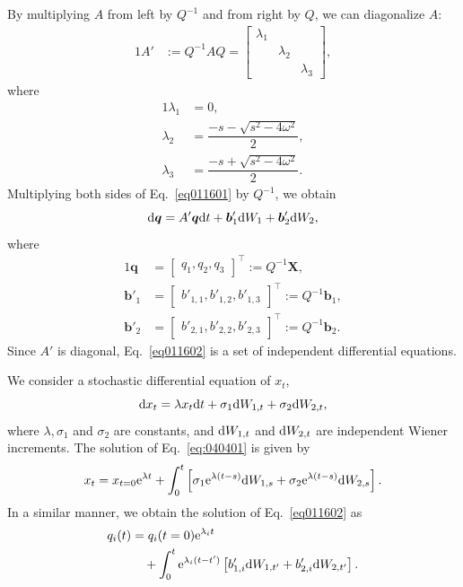 \documentclass[aps,pra,superscriptaddress,twocolumn
]{revtex4-2}
\newcommand{\e}{\mathrm{e}}
\renewcommand{\d}{{\rm d}}
\begin{document}
 By multiplying $A$ from left by $Q^{-1}$ and from right by $Q$, 
 we can diagonalize $A$:
 \begin{alignat}{1}
  A'&:= Q^{-1} A Q=
   \begin{bmatrix}
       \lambda_1 && \\ & \lambda_2 & \\ && \lambda_3
   \end{bmatrix}, 
 \end{alignat}
 where 
 \begin{alignat}{1}
   \lambda_1 &= 0, \\
   \lambda_2 &= \dfrac{-s-\sqrt{s^2-4\omega^2}}{2}, \\
   \lambda_3 &= \dfrac{-s+\sqrt{s^2-4\omega^2}}{2}.
 \end{alignat}
 Multiplying both sides of Eq.~\eqref{eq011601} by $Q^{-1}$, 
 we obtain 
 \begin{equation}
  \d \bm q 
  = A' \bm q \d t + \bm b'_1 \d W_1 + \bm b'_2 \d W_2, \label{eq011602}
 \end{equation}
 where 
 \begin{alignat}{1}
  \bm q &=\begin{bmatrix}
  q_1 , q_2 , q_3
   \end{bmatrix}^\top 
  := Q^{-1} \bm X, \label{eq011603}
  \\
  \bm b'_1 &=
     \begin{bmatrix}
  b'_{1,1} , b'_{1,2} , b'_{1,3}
     \end{bmatrix}^\top
  :=
  Q^{-1} \bm b_1, \\
  \bm b'_2 &=
     \begin{bmatrix}
  b'_{2,1} , b'_{2,2} , b'_{2,3}
     \end{bmatrix}^\top
  := Q^{-1} \bm b_2.
 \end{alignat}
 Since $A'$ is diagonal, Eq.~\eqref{eq011602} is a set of independent differential equations.
 
 We consider a stochastic differential equation of $x_t$, 
 \begin{equation}
  \d x_t = \lambda x_t \d t + \sigma_1 \d W_{1,t} + \sigma_2 \d W_{2,t}, \label{eq:040401}
 \end{equation}
 where $\lambda, \sigma_1$ and $\sigma_2$ are constants, and 
 $\d W_{1,t}$ and $\d W_{2,t}$ are independent Wiener increments.
 The solution of Eq.~\eqref{eq:040401} is given by 
 \begin{equation}
  x_t = x_{t=0} \e^{\lambda t} + \int_0^t \left[
         \sigma_1 \e^{\lambda(t-s)} \d W_{1,s} + \sigma_2 \e^{\lambda(t-s)} \d W_{2,s} 
         \label{eq012001}
  \right].
 \end{equation}
 In a similar manner, we obtain the solution of Eq.~\eqref{eq011602} as 
 \begin{alignat}{1}
  q_i(t) &= q_i(t=0)\e^{\lambda_i t} \notag \\
  &\quad+ \int_0^t \e^{\lambda_i(t-t')}\left[
  b'_{1,i} \d W_{1,t'} + b'_{2,i} \d W_{2,t'}
  \right].
 \end{alignat}
 
\end{document}
